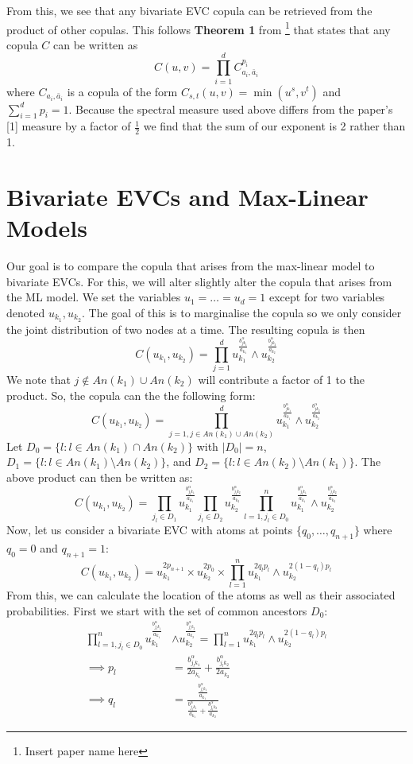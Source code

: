 \documentclass[12pt]{article}
\newcommand{\ds}{\displaystyle}
\theoremstyle{definition}
\theoremstyle{definition}
\begin{document}
From this, we see that any bivariate EVC copula can be retrieved from the product of other copulas. This follows \textbf{Theorem 1} from \footnote{Insert paper name here} that states that any copula $C$ can be written as 
$$C(u,v)= \prod_{i=1}^dC_{a_i,\bar{a}_i}^{p_i}$$
where $C_{a_i,\bar{a}_i}$ is a copula of the form $C_{s,t}(u,v)=\min(u^s,v^t)$ and $\sum_{i=1}^dp_i=1$. Because the spectral measure used above differs from the paper's [1] measure by a factor of $\frac{1}{2}$ we find that the sum of our exponent is 2 rather than 1.
\newpage
\section{Bivariate EVCs and Max-Linear Models}
Our goal is to compare the copula that arises from the max-linear model to bivariate EVCs. For this, we will alter slightly alter the copula that arises from the ML model. We set the variables $u_1=\hdots=u_d=1$ except for two variables denoted $u_{k_1},u_{k_2}$. The goal of this is to marginalise the copula so we only consider the joint distribution of two nodes at a time. The resulting copula is then 
$$C(u_{k_1},u_{k_2})=\prod_{j=1}^du_{k_1}^{\frac{b_{jk_1}^\alpha}{a_{k_1}}}\wedge u_{k_2}^{\frac{b_{jk_2}^\alpha}{a_{k_2}}}$$
We note that $j\notin An(k_1)\cup An(k_2)$ will contribute a factor of 1 to the product. So, the copula can the the following form:
$$C(u_{k_1},u_{k_2})=\prod_{j=1,j\in An(k_1)\cup An(k_2) }^du_{k_1}^{\frac{b_{jk_1}^\alpha}{a_{k_1}}}\wedge u_{k_2}^{\frac{b_{jk_2}^\alpha}{a_{k_2}}}$$
Let $D_0=\{l:l\in An(k_1)\cap An(k_2)\}$ with $|D_0|=n$, $D_1=\{l:l\in An(k_1)\setminus An(k_2)\}$, and $D_2=\{l:l\in An(k_2)\setminus An(k_1)\}$. The above product can then be written as:
$$C(u_{k_1},u_{k_2})=\prod_{j_l\in D_1 }u_{k_1}^{\frac{b_{j_lk_1}^\alpha}{a_{k_1}}} \prod_{j_l\in D_2 }u_{k_2}^{\frac{b_{j_lk_2}^\alpha}{a_{k_2}}}\prod_{l=1,j_l\in D_0 }^n u_{k_1}^{\frac{b_{j_lk_1}^\alpha}{a_{k_1}}}\wedge u_{k_2}^{\frac{b_{j_lk_2}^\alpha}{a_{k_2}}}$$
Now, let us consider a bivariate EVC with atoms at points $\ds\{q_0,\hdots,q_{n+1}\}$ where $q_0=0$ and $q_{n+1}=1$:
$$C(u_{k_1},u_{k_2})= u_{k_1}^{2p_{n+1}} \times u_{k_2}^{2p_0}\times  \prod_{l=1}^{n} u_{k_1}^{2q_lp_l}\wedge u_{k_2}^{2(1-q_l)p_l}$$
From this, we can calculate the location of the atoms as well as their associated probabilities. First we start with the set of common ancestors $D_0$:
\begin{align*}
    \prod_{l=1,j_l\in D_0}^nu_{k_1}^{\frac{b_{j_lk_1}^\alpha}{a_{k_1}}}&\wedge u_{k_2}^{\frac{b_{j_lk_2}^\alpha}{a_{k_2}}}=\prod_{l=1}^{n} u_{k_1}^{2q_lp_l}\wedge u_{k_2}^{2(1-q_l)p_l}\\
    \implies p_l&=\frac{b_{j_lk_1}^\alpha}{2a_{k_1}}+\frac{b_{j_lk_2}^\alpha}{2a_{k_2}}\\
    \implies q_l&=\frac{\frac{b_{j_lk_1}^\alpha}{a_{k_1}}}{\frac{b_{j_lk_1}^\alpha}{a_{k_1}}+\frac{b_{j_lk_2}^\alpha}{a_{k_2}}}%
\end{align*}
\end{document}
